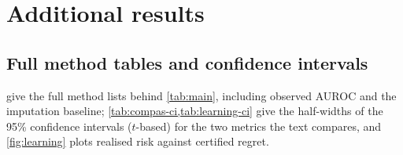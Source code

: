 \section{Additional results}
\label{app:more}

\subsection{Full method tables and confidence intervals}
\label{app:more-tables}

 give the full method lists behind
\cref{tab:main}, including observed AUROC and the imputation baseline;
\cref{tab:compas-ci,tab:learning-ci} give the half-widths of the 95\%
confidence intervals ($t$-based) for the two metrics the text compares, and
\cref{fig:learning} plots realised risk against certified regret.

